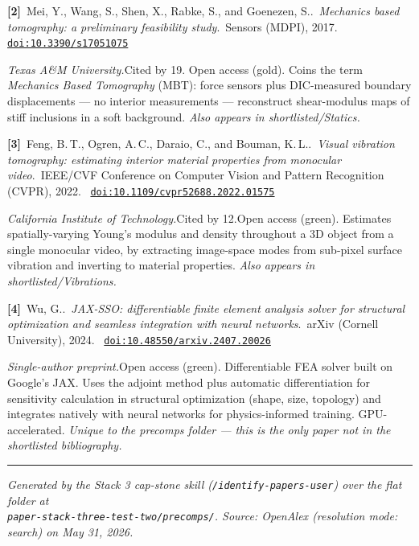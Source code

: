 \documentclass[11pt]{article}
\newcommand{\bibentry}[6]{%
  \noindent\textbf{[#1]}~#2.~\textit{#3}.~#4, #5.~%
  \href{https://doi.org/#6}{\texttt{doi:#6}}\par\vspace{6pt}
}
\begin{document}
\bibentry{2}{Mei, Y., Wang, S., Shen, X., Rabke, S., and Goenezen, S.}{Mechanics based tomography: a preliminary feasibility study}{Sensors (MDPI)}{2017}{10.3390/s17051075}

\textit{Texas A\&M University.}\quad Cited by 19. \quad Open access (gold). \quad
Coins the term \emph{Mechanics Based Tomography} (MBT): force sensors plus DIC-measured boundary displacements --- no interior measurements --- reconstruct shear-modulus maps of stiff inclusions in a soft background. \emph{Also appears in shortlisted/Statics.}

\bibentry{3}{Feng, B.\,T., Ogren, A.\,C., Daraio, C., and Bouman, K.\,L.}{Visual vibration tomography: estimating interior material properties from monocular video}{IEEE/CVF Conference on Computer Vision and Pattern Recognition (CVPR)}{2022}{10.1109/cvpr52688.2022.01575}

\textit{California Institute of Technology.}\quad Cited by 12.\quad Open access (green). \quad
Estimates spatially-varying Young's modulus and density throughout a 3D object from a single monocular video, by extracting image-space modes from sub-pixel surface vibration and inverting to material properties. \emph{Also appears in shortlisted/Vibrations.}

\bibentry{4}{Wu, G.}{JAX-SSO: differentiable finite element analysis solver for structural optimization and seamless integration with neural networks}{arXiv (Cornell University)}{2024}{10.48550/arxiv.2407.20026}

\textit{Single-author preprint.}\quad Open access (green). \quad
Differentiable FEA solver built on Google's JAX. Uses the adjoint method plus automatic differentiation for sensitivity calculation in structural optimization (shape, size, topology) and integrates natively with neural networks for physics-informed training. GPU-accelerated. \emph{Unique to the precomps folder --- this is the only paper not in the shortlisted bibliography.}

\vspace{2em}
\hrule
\vspace{0.5em}

{\footnotesize\itshape
Generated by the Stack 3 cap-stone skill (\texttt{/identify-papers-user}) over the flat folder at \\
\texttt{paper-stack-three-test-two/precomps/}. Source: OpenAlex (resolution mode: search) on May 31, 2026.
}
\end{document}
